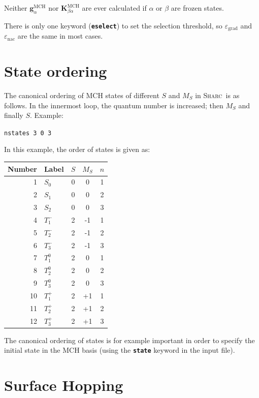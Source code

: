 \documentclass[a4paper,11pt,DIV=15,openany,twoside=false]{scrbook}
\newcommand{\sharc}{\textsc{Sharc}}
\newcommand{\ttt}[1]{\textbf{\texttt{#1}}}
\newcommand{\VEC}[1]{\ensuremath{\mathbf{#1}}}
\newenvironment{example}{
  \vspace{0mm}
  \definecolor{shadecolor}{HTML}{E4F4FF}
  \begin{shaded}
}{
  \end{shaded}
}
\begin{document}
Neither $\VEC{g}^{\text{MCH}}_\alpha$ nor $\VEC{K}^{\text{MCH}}_{\beta\alpha}$ are ever calculated if $\alpha$ or $\beta$ are frozen states.

There is only one keyword (\ttt{eselect}) to set the selection threshold, so $\varepsilon_\text{grad}$ and $\varepsilon_\text{nac}$ are the same in most cases. 


\section{State ordering}\label{met:ordering}

The canonical ordering of MCH states of different $S$ and $M_S$ in \sharc\ is as follows. In the innermost loop, the quantum number is increased; then $M_S$ and finally $S$. Example:

\begin{example}
  \verb|nstates 3 0 3|
\end{example}

In this example, the order of states is given as:

\begin{tabular}{rlccc}
  \toprule
  Number      &Label       &$S$ &$M_S$  &$n$\\
  \midrule
  1&$S_0$       &0&0&1\\
  2&$S_1$       &0&0&2\\
  3&$S_2$       &0&0&3\\
  4&$T_1^-$       &2&-1&1\\
  5&$T_2^-$       &2&-1&2\\
  6&$T_3^-$       &2&-1&3\\
  7&$T_1^0$       &2&0&1\\
  8&$T_2^0$       &2&0&2\\
  9&$T_3^0$       &2&0&3\\
  10&$T_1^+$       &2&+1&1\\
  11&$T_2^+$       &2&+1&2\\
  12&$T_3^+$       &2&+1&3\\
  \bottomrule
\end{tabular}

The canonical ordering of states is for example important in order to specify the initial state in the MCH basis (using the \ttt{state} keyword in the input file).


\section{Surface Hopping}
\end{document}
